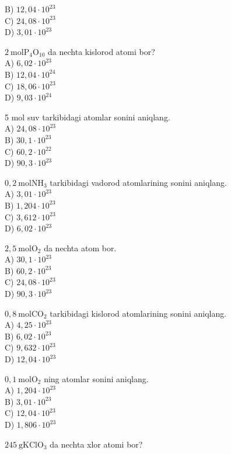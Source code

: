 B) $12,04 \cdot 10^{23}$\\
C) $24,08 \cdot 10^{23}$\\
D) $3,01 \cdot 10^{23}$
  \item $2 \mathrm{~mol} \mathrm{P}_{4} \mathrm{O}_{10}$ da nechta kislorod atomi bor?\\
A) $6,02 \cdot 10^{23}$\\
B) $12,04 \cdot 10^{24}$\\
C) $18,06 \cdot 10^{23}$\\
D) $9,03 \cdot 10^{24}$
  \item 5 mol suv tarkibidagi atomlar sonini aniqlang.\\
A) $24,08 \cdot 10^{23}$\\
B) $30,1 \cdot 10^{23}$\\
C) $60,2 \cdot 10^{22}$\\
D) $90,3 \cdot 10^{23}$
  \item $0,2 \mathrm{~mol} \mathrm{NH}_{3}$ tarkibidagi vadorod atomlarining sonini aniqlang.\\
A) $3,01 \cdot 10^{23}$\\
B) $1,204 \cdot 10^{23}$\\
C) $3,612 \cdot 10^{23}$\\
D) $6,02 \cdot 10^{23}$
  \item $2,5 \mathrm{~mol} \mathrm{O}_{2}$ da nechta atom bor.\\
A) $30,1 \cdot 10^{23}$\\
B) $60,2 \cdot 10^{23}$\\
C) $24,08 \cdot 10^{23}$\\
D) $90,3 \cdot 10^{23}$
  \item $0,8 \mathrm{~mol} \mathrm{CO}_{2}$ tarkibidagi kislorod atomlarining sonini aniqlang.\\
A) $4,25 \cdot 10^{23}$\\
B) $6,02 \cdot 10^{23}$\\
C) $9,632 \cdot 10^{23}$\\
D) $12,04 \cdot 10^{23}$
  \item $0,1 \mathrm{~mol} \mathrm{O}_{2}$ ning atomlar sonini aniqlang.\\
A) $1,204 \cdot 10^{23}$\\
B) $3,01 \cdot 10^{23}$\\
C) $12,04 \cdot 10^{23}$\\
D) $1,806 \cdot 10^{23}$
  \item $245 \mathrm{~g} \mathrm{KClO}_{3}$ da nechta xlor atomi bor?\\
